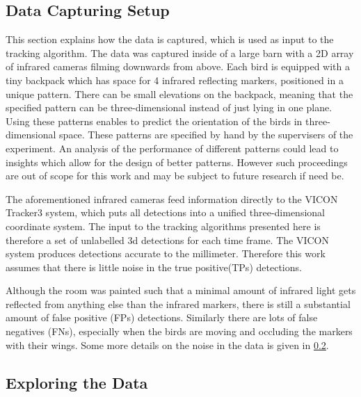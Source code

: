 \documentclass{article}
\begin{document}
\subsection{Data Capturing Setup}
\label{data_setup}


This section explains how the data is captured, which is used as input to the tracking algorithm. 
The data was captured inside of a large barn with a 2D array of infrared cameras filming downwards from above. Each bird is equipped with a tiny backpack which has space for 4 infrared reflecting markers, positioned in a unique pattern. There can be small elevations on the backpack, meaning that the specified pattern can be three-dimensional instead of just lying in one plane. Using these patterns enables to predict the orientation of the birds in three-dimensional space. These patterns are specified by hand by the supervisers of the experiment. An analysis of the performance of different patterns could lead to insights which allow for the design of better patterns. However such proceedings are out of scope for this work and may be subject to future research if need be.

The aforementioned infrared cameras feed information directly to the VICON Tracker3 system, which puts all detections into a unified three-dimensional coordinate system. The input to the tracking algorithms presented here is therefore a set of unlabelled 3d detections for each time frame. The VICON system produces detections accurate to the millimeter. Therefore this work assumes that there is little noise in the true positive(TPs) detections.

 Although the room was painted such that a minimal amount of infrared light gets reflected from anything else than the infrared markers, there is still a substantial amount of false positive (FPs) detections. Similarly there are lots of false negatives (FNs), especially when the birds are moving and occluding the markers with their wings. Some more details on the noise in the data is given in \ref{data_noise}.


\subsection{Exploring the Data}
\label{data_noise}

\end{document}
